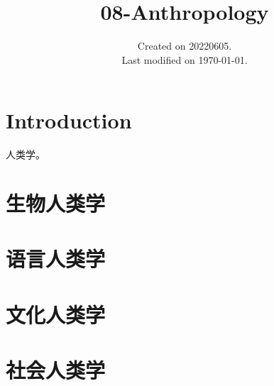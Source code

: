 \documentclass[UTF8]{../RepresentationUniverse}
\begin{document}
\title{08-Anthropology}
\date{Created on 20220605.\\   Last modified on \today.}
\maketitle
\tableofcontents


\chapter{Introduction}
人类学。

\chapter{生物人类学}
\chapter{语言人类学}
\chapter{文化人类学}
\chapter{社会人类学}
\end{document}
